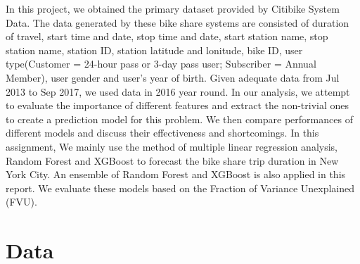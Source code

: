   \par In this project, we obtained the primary dataset provided by Citibike System Data. The data generated by these bike share systems are consisted of duration of travel, start time and date, stop time and date, start station name, stop station name, station ID, station latitude and lonitude, bike ID, user type(Customer = 24-hour pass or 3-day pass user; Subscriber = Annual Member), user gender and user's year of birth. Given adequate data from Jul 2013 to Sep 2017, we used data in 2016 year round. In our analysis, we attempt to evaluate the importance of different features and extract the non-trivial ones to create a prediction model for this problem. We then compare performances of different models and discuss their effectiveness and shortcomings. In this assignment, We mainly use the method of multiple linear regression analysis, Random Forest and XGBoost to forecast the bike share trip duration in New York City. An ensemble of Random Forest and XGBoost is also applied in this report. We evaluate these models based on the Fraction of Variance Unexplained (FVU). 

\section{Data}
